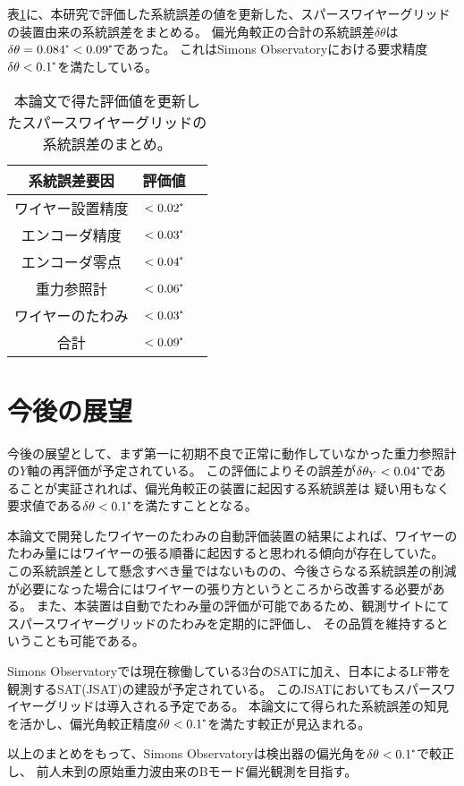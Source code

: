 \documentclass[../../main.tex]{subfiles}
\begin{document}
表\ref{tab:summary_systematic_error}に、本研究で評価した系統誤差の値を更新した、スパースワイヤーグリッドの装置由来の系統誤差をまとめる。
偏光角較正の合計の系統誤差$\delta\theta$は$\delta\theta=0.084\tcdegree<0.09\tcdegree$であった。
これはSimons Observatoryにおける要求精度$\delta\theta<0.1\tcdegree$を満たしている。
\begin{table}[H]
    \centering
    \caption{本論文で得た評価値を更新したスパースワイヤーグリッドの系統誤差のまとめ。}
    \begin{tabular}{ccc}
        \hline\hline
        系統誤差要因 & 評価値 \\
        \hline
        ワイヤー設置精度 & $<0.02\tcdegree$ \\
        エンコーダ精度 & $<0.03\tcdegree$ \\
        エンコーダ零点 & $<0.04\tcdegree$ \\
        重力参照計\tnote{$X$軸の精度が$\delta\theta<0.04\tcdegree$と評価値であるのに対し、}\tnote{これは望遠鏡が基本姿勢$\mathrm{elevation}=50\tcdegree,\,\mathrm{boresight}=0\tcdegree$をとっているときの値であることに注意。} & $<0.06\tcdegree$ \\
        ワイヤーのたわみ & $<0.03\tcdegree$ \\
        \hline
        合計 & $<0.09\tcdegree$ \\
        \hline
        \hline
    \end{tabular}
    \label{tab:summary_systematic_error}
\end{table}
\section{今後の展望}
今後の展望として、まず第一に初期不良で正常に動作していなかった重力参照計の$Y$軸の再評価が予定されている。
この評価によりその誤差が$\delta\theta_{Y}<0.04\tcdegree$であることが実証されれば、偏光角較正の装置に起因する系統誤差は
疑い用もなく要求値である$\delta\theta<0.1\tcdegree$を満たすこととなる。

本論文で開発したワイヤーのたわみの自動評価装置の結果によれば、ワイヤーのたわみ量にはワイヤーの張る順番に起因すると思われる傾向が存在していた。
この系統誤差として懸念すべき量ではないものの、今後さらなる系統誤差の削減が必要になった場合にはワイヤーの張り方というところから改善する必要がある。
また、本装置は自動でたわみ量の評価が可能であるため、観測サイトにてスパースワイヤーグリッドのたわみを定期的に評価し、
その品質を維持するということも可能である。

Simons Observatoryでは現在稼働している3台のSATに加え、日本によるLF帯を観測するSAT(JSAT)の建設が予定されている。
このJSATにおいてもスパースワイヤーグリッドは導入される予定である。
本論文にて得られた系統誤差の知見を活かし、偏光角較正精度$\delta\theta<0.1\tcdegree$を満たす較正が見込まれる。

以上のまとめをもって、Simons Observatoryは検出器の偏光角を$\delta\theta<0.1\tcdegree$で較正し、
前人未到の原始重力波由来のBモード偏光観測を目指す。
\end{document}
